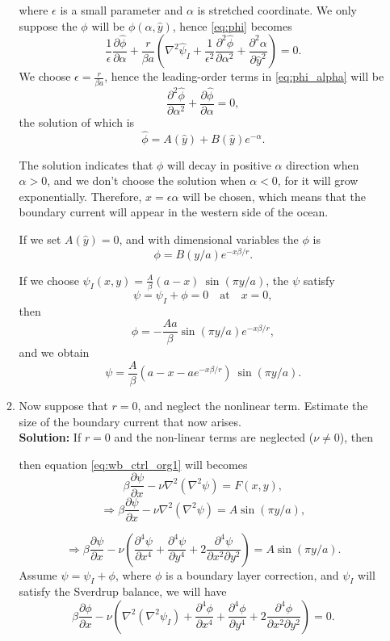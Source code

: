 \documentclass[a4paper]{article}
\begin{document}
\begin{enumerate}[label=\textbf{\arabic*.}]
\begin{enumerate}[label=\textbf{(\alph*)}]
		where $\epsilon$ is a small parameter and $\alpha$ is stretched coordinate. We only suppose the $\phi$ will be $\phi(\alpha, \hat{y})$, hence \eqref{eq:phi} becomes
		\begin{equation}\label{eq:phi_alpha}
			\frac{1}{\epsilon}\frac{\partial \hat{\phi}}{\partial \alpha } +\frac{r}{\beta a} \left(\nabla^2 \hat{\psi}_I+ \frac{1}{\epsilon^2} \frac{\partial^2 \hat{\phi}}{ \partial\alpha^2} + \frac{\partial^2 \alpha}{ \partial \hat{y}^2} \right) = 0.
		\end{equation}
		We choose $\epsilon=\frac{r}{\beta a}$, hence the leading-order terms in \eqref{eq:phi_alpha} will be
		$$\frac{\partial^2 \hat{\phi}}{ \partial\alpha^2} + \frac{\partial \hat{\phi}}{ \partial\alpha} = 0,$$
		the solution of which is
		$$\hat{\phi} = A(\hat{y})+B(\hat{y})e^{-\alpha}.$$
		
		The solution indicates that $\phi$ will decay in positive $\alpha$ direction when $\alpha>0$, and we don't choose the solution when $\alpha<0$, for it will grow exponentially. Therefore, $x=\epsilon \alpha$ will be chosen, which means that the boundary current will appear in the western side of the ocean.
		
		If we set $A(\hat{y})=0$, and with dimensional variables the $\phi$ is
		$$\phi = B(y/a)e^{-x\beta /r}.$$
		
		If we choose $\psi_I(x,y) =  \frac{A}{\beta}(a-x)~\sin (\pi y/a)$, the $\psi$ satisfy
		$$\psi=\psi_I+\phi =0 \quad \text{at}\quad x=0,$$
		then 
		$$\phi = -\frac{Aa}{\beta}\sin (\pi y/a) e^{-x\beta /r},$$
		and we obtain
		$$\psi = \frac{A}{\beta}(a-x-ae^{-x\beta /r})~\sin (\pi y/a).$$
		
		
		\item Now suppose that $r = 0$, and neglect the nonlinear term. Estimate the size of the
boundary current that now arises.\\
		
		\textbf{Solution:} If $r=0$ and the non-linear terms are neglected ($\nu \neq 0$), then 
		
		then equation \eqref{eq:wb_ctrl_org1} will becomes
		$$\beta \frac{\partial \psi}{\partial x} - \nu \nabla^2\left(\nabla^{2}\psi\right)= F(x ,y ),$$
		$$\Longrightarrow \beta \frac{\partial \psi}{\partial x} - \nu \nabla^2\left(\nabla^{2}\psi\right) = A\sin (\pi y/a),$$
		
		$$\Longrightarrow \beta \frac{\partial \psi}{\partial x} - \nu \left( \frac{\partial^4 \psi}{\partial x^4} + \frac{\partial^4 \psi}{\partial y^4} + 2\frac{\partial^4 \psi}{\partial x^2\partial y^2} \right) = A\sin (\pi y/a).$$
		Assume $\psi=\psi_I+\phi$, where $\phi$ is a boundary layer correction, and $\psi_I$ will satisfy the Sverdrup balance, we will have
		$$\beta \frac{\partial \phi}{\partial x} - \nu \left(\nabla^2\left(\nabla^{2}\psi_I\right)+ \frac{\partial^4 \phi}{\partial x^4} + \frac{\partial^4 \phi}{\partial y^4} + 2\frac{\partial^4 \phi}{\partial x^2\partial y^2} \right) = 0.$$
		

\end{enumerate}
\end{enumerate}
\end{document}

